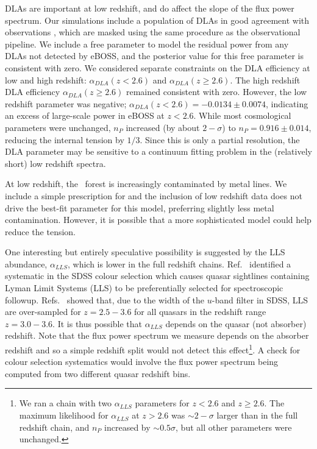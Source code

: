 DLAs are important at low redshift, and do affect the slope of the flux power spectrum.
Our simulations include a population of DLAs in good agreement with observations \cite{2023simsuite}, which are masked using the same procedure as the observational pipeline.
We include a free parameter to model the residual power from any DLAs not detected by eBOSS, and the posterior value for this free parameter is consistent with zero.
We considered separate constraints on the DLA efficiency at low and high redshift: $\alpha_{DLA}(z < 2.6)$ and $\alpha_{DLA}(z \geq 2.6)$. The high redshift DLA efficiency $\alpha_{DLA}(z \geq 2.6)$ remained consistent with zero. However, the low redshift parameter was negative; $\alpha_{DLA}(z < 2.6) = -0.0134 \pm 0.0074$, indicating an excess of large-scale power in eBOSS at $z < 2.6$. While most cosmological parameters were unchanged, $n_P$ increased (by about $2-\sigma$) to $n_P = 0.916 \pm 0.014$, reducing the internal tension by $1/3$. Since this is only a partial resolution, the DLA parameter may be sensitive to a continuum fitting problem in the (relatively short) low redshift spectra.

At low redshift, the \Lya~forest is increasingly contaminated by metal lines.
We include a simple prescription for  and the inclusion of low redshift data does not drive the best-fit parameter for this model, preferring slightly less metal contamination.
However, it is possible that a more sophisticated model could help reduce the tension.

One interesting but entirely speculative possibility is suggested by the LLS abundance, $\alpha_{LLS}$, which is lower in the full redshift chains.
Ref.~\cite{Prochaska:2009a} identified a systematic in the SDSS colour selection which causes quasar sightlines containing Lyman Limit Systems (LLS) to be preferentially selected for spectroscopic followup.
Refs.~\cite{Worseck:2011, Fumagalli:2013} showed that, due to the width of the $u$-band filter in SDSS, LLS are over-sampled for $z=2.5-3.6$ for all quasars in the redshift range $z=3.0-3.6$.
It is thus possible that $\alpha_{LLS}$ depends on the quasar (not absorber) redshift.
Note that the flux power spectrum we measure depends on the absorber redshift and so a simple redshift split would not detect this effect\footnote{We ran a chain with two $\alpha_{LLS}$ parameters for $z < 2.6$ and $z \geq 2.6$. The maximum likelihood for $\alpha_{LLS}$ at $z > 2.6$ was $\sim 2-\sigma$ larger than in the full redshift chain, and $n_P$ increased by $\sim 0.5\sigma$, but all other parameters were unchanged.}.
A check for colour selection systematics would involve the flux power spectrum being computed from two different quasar redshift bins.

